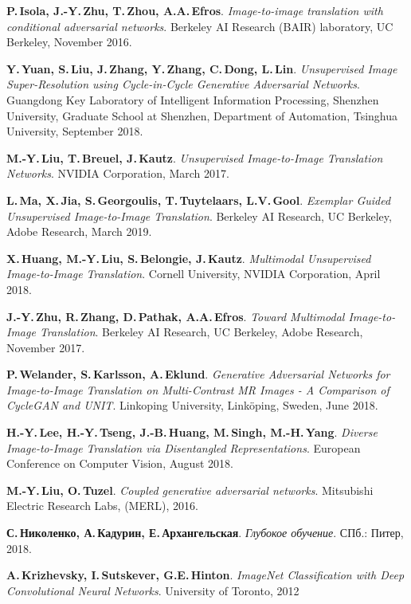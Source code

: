 \documentclass[11pt,a4paper]{extarticle}
\begin{document}
{\begin{thebibliography}{00}
	\textbf{P.\,Isola, J.-Y.\,Zhu, T.\,Zhou, A.A.\,Efros}.
	\emph{Image-to-image translation with conditional adversarial networks}.
	Berkeley AI Research (BAIR) laboratory, UC Berkeley,
	November 2016.

	\textbf{Y.\,Yuan, S.\,Liu, J.\,Zhang, Y.\,Zhang, C.\,Dong, L.\,Lin}.
	\emph{Unsupervised Image Super-Resolution using Cycle-in-Cycle Generative Adversarial Networks}.
	Guangdong Key Laboratory of Intelligent Information Processing, Shenzhen University,
	Graduate School at Shenzhen, Department of Automation, Tsinghua University,
	September 2018.

	\textbf{M.-Y.\,Liu, T.\,Breuel, J.\,Kautz}.
	\emph{Unsupervised Image-to-Image Translation Networks}.
	NVIDIA Corporation,
	March 2017.
	
	\textbf{L.\,Ma, X.\,Jia, S.\,Georgoulis, T.\,Tuytelaars, L.V.\,Gool}.
	\emph{Exemplar Guided Unsupervised Image-to-Image Translation}.
	Berkeley AI Research, UC Berkeley, Adobe Research,
	March 2019.

	\textbf{X.\,Huang, M.-Y.\,Liu, S.\,Belongie, J.\,Kautz}.
	\emph{Multimodal Unsupervised Image-to-Image Translation}.
	Cornell University, NVIDIA Corporation,
	April 2018.
	
	\textbf{J.-Y.\,Zhu, R.\,Zhang, D.\,Pathak, A.A.\,Efros}.
	\emph{Toward Multimodal Image-to-Image Translation}.
	Berkeley AI Research, UC Berkeley, Adobe Research,
	November 2017.
	
	\textbf{P.\,Welander, S.\,Karlsson, A.\,Eklund}.
	\emph{Generative Adversarial Networks for Image-to-Image Translation on Multi-Contrast MR Images - A Comparison of CycleGAN and UNIT}.
	Linkoping University, Linköping, Sweden,
	June 2018.

	\textbf{H.-Y.\,Lee, H.-Y.\,Tseng, J.-B.\,Huang, M.\,Singh, M.-H.\,Yang}.
	\emph{Diverse Image-to-Image Translation via Disentangled Representations}.
	European Conference on Computer Vision,
	August 2018.

	\textbf{M.-Y.\,Liu, O.\,Tuzel}.
	\emph{Coupled generative adversarial networks}.
	Mitsubishi Electric Research Labs, (MERL),
	2016.

	\textbf{С.\,Николенко, А.\,Кадурин, Е.\,Архангельская}.
	\emph{Глубокое обучение}.
	СПб.: Питер, 
	2018.

	\textbf{A.\,Krizhevsky, I.\,Sutskever, G.E.\,Hinton}.
	\emph{ImageNet Classification with Deep Convolutional Neural Networks}.
	University of Toronto,
	2012


\end{thebibliography}}
\end{document}
